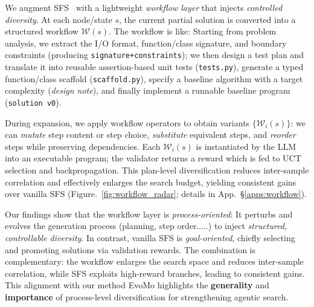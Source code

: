 \documentclass[11pt]{article}
\theoremstyle{definition}
\theoremstyle{remark}
\newcommand{\ourmethod}{{\fontfamily{lmtt}\selectfont EvoMo}\xspace}
\begin{document}
We augment SFS~\citep{light2025sfs} with a lightweight \emph{workflow layer} that injects
\emph{controlled diversity}. At each node/state $s$, the current partial
solution is converted into a structured workflow $\mathcal{W}(s)$. The workflow is like: Starting from problem analysis, we extract the I/O format, function/class signature, and boundary constraints (producing \texttt{signature+constraints}); we then design a test plan and translate it into reusable assertion-based unit tests (\texttt{tests.py}), generate a typed function/class scaffold (\texttt{scaffold.py}), specify a baseline algorithm with a target complexity (\emph{design note}), and finally implement a runnable baseline program (\texttt{solution v0}).
 



During expansion, we apply workflow
operators to obtain variants $\{\mathcal{W}_i(s)\}$: we can \emph{mutate} step
content or step choice, \emph{substitute} equivalent steps, and \emph{reorder}
steps while preserving dependencies. Each $\mathcal{W}_i(s)$ is instantiated by
the LLM into an executable program; the validator returns a reward which is fed
to UCT selection and backpropagation. This plan-level diversification reduces inter-sample correlation
and effectively enlarges the search budget, yielding consistent gains over
vanilla SFS (Figure.~\ref{fig:workflow_radar}; details in App.~\S\ref{apps:workflow}).


Our findings show that the workflow layer is \emph{process-oriented}:
It perturbs and evolves the generation process (planning, step order.....) to inject \emph{structured, controllable
diversity}. In contrast, vanilla SFS is \emph{goal-oriented}, chiefly
selecting and promoting solutions via validation rewards. The combination
is complementary: the workflow enlarges the search space and reduces
inter-sample correlation, while SFS exploits high-reward branches,
leading to consistent gains. This alignment with our method \ourmethod highlights the \textbf{generality} and
\textbf{importance} of process-level diversification for strengthening
agentic search. 
\end{document}
